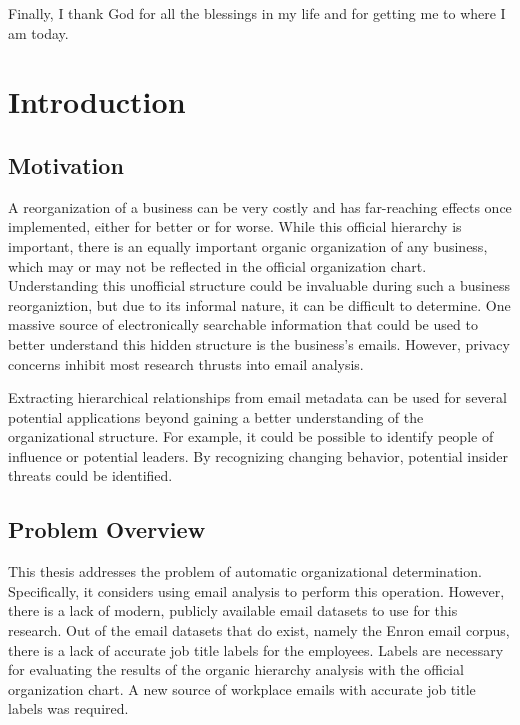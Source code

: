\documentclass[12pt]{report}
\begin{document}
Finally, I thank God for all the blessings in my life and for getting me to where I am today.
\tableofcontents
\pagebreak

\listoffigures
\pagebreak

\listoftables
\pagebreak

\pagestyle{myheadings}

\chapter{Introduction} \label{Introduction}
\section{Motivation}
A reorganization of a business can be very costly and has far-reaching effects once implemented, either for better or for worse.
While this official hierarchy is important, there is an equally important organic organization of any business, which may or may not be reflected in the official organization chart.
Understanding this unofficial structure could be invaluable during such a business reorganiztion, but due to its informal nature, it can be difficult to determine.
One massive source of electronically searchable information that could be used to better understand this hidden structure is the business's emails.
However, privacy concerns inhibit most research thrusts into email analysis.  

Extracting hierarchical relationships from email metadata can be used for several potential applications beyond gaining a better understanding of the organizational structure.  For example, it could be possible to identify people of influence or potential leaders.  By recognizing changing behavior, potential insider threats could be identified.

\section{Problem Overview}
This thesis addresses the problem of automatic organizational determination.
Specifically, it considers using email analysis to perform this operation.
However, there is a lack of modern, publicly available email datasets to use for this research.
Out of the email datasets that do exist, namely the Enron email corpus, there is a lack of accurate job title labels for the employees.
Labels are necessary for evaluating the results of the organic hierarchy analysis with the official organization chart.
A new source of workplace emails with accurate job title labels was required.  
\end{document}
